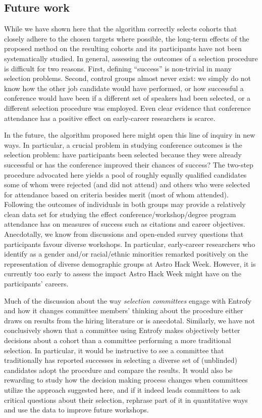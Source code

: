 \documentclass[10pt,letterpaper]{article}
\begin{document}
\subsection*{Future work}
While we have shown here that the algorithm correctly selects cohorts that closely adhere to the chosen targets where possible, the long-term effects of the proposed method on the resulting cohorts and its participants have not been systematically studied.
In general, assessing the outcomes of a selection procedure is difficult for two reasons.
First, defining ``success'' is non-trivial in many selection problems.
Second, control groups almost never exist: we simply do not know how the other job candidate would have performed, or how successful a conference would have been if a different set of speakers had been selected, or a different selection procedure was employed.
Even clear evidence that conference attendance has a positive effect on early-career researchers is scarce.

In the future, the algorithm proposed here might open this line of inquiry in new ways.
In particular, a crucial problem in studying conference outcomes is the selection problem: have participants been selected because they were already successful or has the conference improved their chances of success?
The two-step procedure advocated here yields a pool of roughly equally qualified candidates some of whom were rejected (and did not attend) and others who were selected for attendance based on criteria besides merit (most of whom attended).
Following the outcomes of individuals in both groups may provide a relatively clean data set for studying the effect conference/workshop/degree program attendance has on measures of success such as citations and career objectives. 
Anecdotally, we know from discussions and open-ended survey questions that participants favour diverse workshops.
In particular, early-career researchers who identify as a gender and/or racial/ethnic minorities remarked positively on the representation of diverse demographic groups at Astro Hack Week.
However, it is currently too early to assess the impact Astro Hack Week might have on the participants' careers. 

Much of the discussion about the way \textit{selection committees} engage with Entrofy and how it changes committee members' thinking about the procedure  either draws on results from the hiring literature or is anecdotal.
Similarly, we have not conclusively shown that a committee using Entrofy makes objectively better decisions about a cohort than a committee performing a more traditional selection.  
In particular, it would be instructive to see a committee that traditionally has reported successes in selecting a diverse set of (unblinded) candidates adopt the procedure and compare the results.
It would also be rewarding to study how the decision making process changes when committees utilize the approach suggested here, and if it indeed leads committees to ask critical questions about their selection, rephrase part of it in quantitative ways and use the data to improve future workshops.
\end{document}
